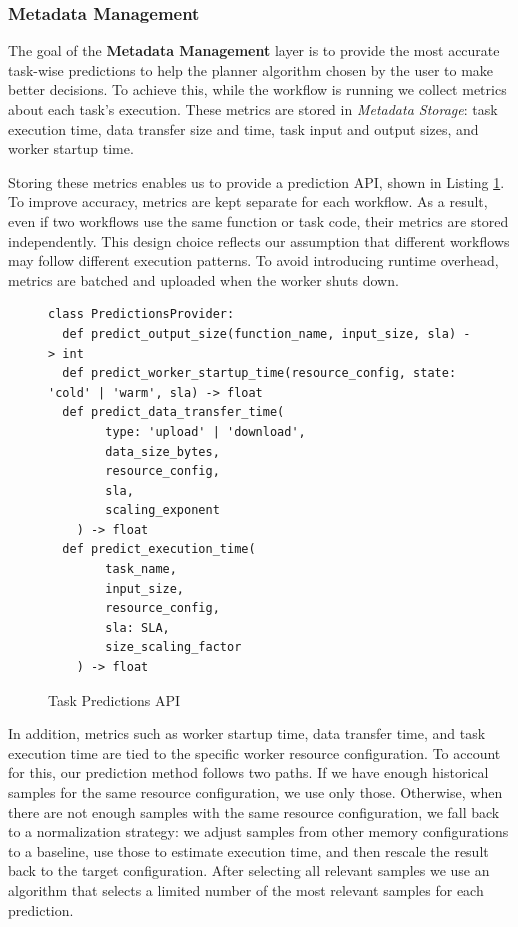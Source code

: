 \documentclass[conference]{IEEEtran}
\begin{document}
\subsubsection{Metadata Management}
The goal of the \textbf{Metadata Management} layer is to provide the most accurate task-wise predictions to help the planner algorithm chosen by the user to make better decisions. To achieve this, while the workflow is running we collect metrics about each task's execution. These metrics are stored in \textit{Metadata Storage}: task execution time, data transfer size and time, task input and output sizes, and worker startup time. 

Storing these metrics enables us to provide a prediction API, shown in Listing \ref{lst:task_predictions_api}. To improve accuracy, metrics are kept separate for each workflow. As a result, even if two workflows use the same function or task code, their metrics are stored independently. This design choice reflects our assumption that different workflows may follow different execution patterns. To avoid introducing runtime overhead, metrics are batched and uploaded when the worker shuts down.

\begin{figure}[h]
\centering
\begin{lstlisting}[basicstyle=\ttfamily\footnotesize, columns=fullflexible, breaklines=true]
class PredictionsProvider:
  def predict_output_size(function_name, input_size, sla) -> int
  def predict_worker_startup_time(resource_config, state: 'cold' | 'warm', sla) -> float
  def predict_data_transfer_time(
        type: 'upload' | 'download',
        data_size_bytes,
        resource_config,
        sla,
        scaling_exponent
    ) -> float
  def predict_execution_time(
        task_name,
        input_size,
        resource_config,
        sla: SLA,
        size_scaling_factor
    ) -> float
\end{lstlisting}
\caption{Task Predictions API}
\label{lst:task_predictions_api}
\end{figure}

In addition, metrics such as worker startup time, data transfer time, and task execution time are tied to the specific worker resource configuration. To account for this, our prediction method follows two paths. If we have enough historical samples for the same resource configuration, we use only those. Otherwise, when there are not enough samples with the same resource configuration, we fall back to a normalization strategy: we adjust samples from other memory configurations to a baseline, use those to estimate execution time, and then rescale the result back to the target configuration. After selecting all relevant samples we use an algorithm that selects a limited number of the most relevant samples for each prediction.
\end{document}
